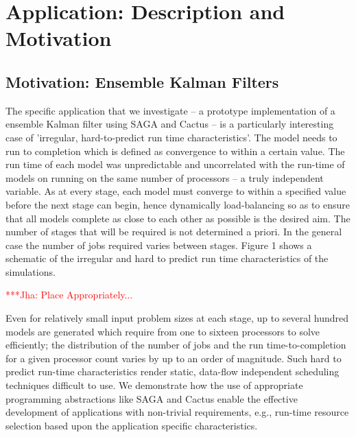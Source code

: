 \documentclass[conference,final]{IEEEtran}
\newcommand{\jhanote}[1]{ {\textcolor{red} { ***Jha: #1 }}}
\newcommand{\jhanote}[1]{}
\begin{document}
\section{Application: Description and Motivation} 

\subsection{Motivation: Ensemble Kalman Filters}

The specific application that we investigate -- a prototype
implementation of a ensemble Kalman filter using SAGA and Cactus -- is
a particularly interesting case of 'irregular, hard-to-predict run
time characteristics'.  The model needs to run to completion which is
defined as convergence to within a certain value.  The run time of
each model was unpredictable and uncorrelated with the run-time of
models on running on the same number of processors -- a truly
independent variable.  As at every stage, each model must converge to
within a specified value before the next stage can begin, hence
dynamically load-balancing so as to ensure that all models complete as
close to each other as possible is the desired aim.  The number of
stages that will be required is not determined a priori. In the
general case the number of jobs required varies between stages.
Figure 1 shows a schematic of the irregular and hard to predict run
time characteristics of the simulations.

\jhanote{Place Appropriately...}

Even for relatively small input problem sizes at each stage, up to
several hundred models are generated which require from one to sixteen
processors to solve efficiently; the distribution of the number of
jobs and the run time-to-completion for a given processor count varies
by up to an order of magnitude.  Such hard to predict run-time
characteristics render static, data-flow independent scheduling
techniques difficult to use.  We demonstrate how the use of
appropriate programming abstractions like SAGA and Cactus enable the
effective development of applications with non-trivial requirements,
e.g., run-time resource selection based upon the application specific
characteristics.


\end{document}
